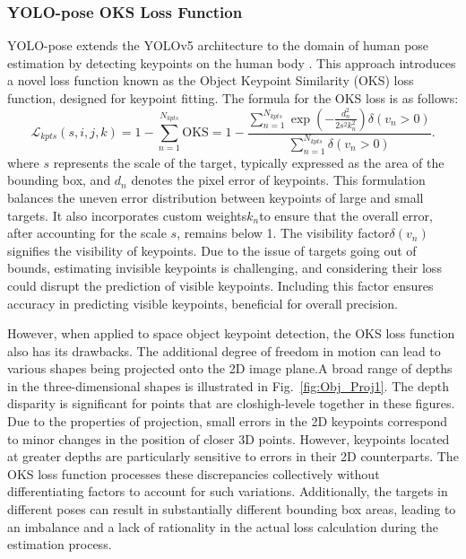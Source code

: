 \documentclass[a4paper,fleqn]{cas-sc}
\begin{document}
\subsubsection{YOLO-pose OKS Loss Function}
YOLO-pose extends the YOLOv5 architecture to the domain of human pose estimation by detecting keypoints on the human body \citep{yolo_pose}. This approach introduces a novel loss function known as the Object Keypoint Similarity (OKS) loss function, designed for keypoint fitting. The formula for the OKS loss is as follows:
\begin{equation}
	\mathcal{L}_{kpts}(s, i, j, k) 
    = 1 - \sum_{n=1}^{N_{kpts}} \mathrm{OKS} 
    = 1 - \frac{\sum\limits_{n=1}^{N_{kpts}} \exp \left(-\frac{d_{n}^{2}}{2 s^{2} k_{n}^{2}}\right) \delta\left(v_{n} > 0\right)}{\sum\limits_{n=1}^{N_{kpts}} \delta\left(v_{n} > 0\right)}.
\end{equation}
where $s$  represents the scale of the target, typically expressed as the area of the bounding box, and $ d_n $ denotes the pixel error of keypoints. This formulation balances the uneven error distribution between keypoints of large and small targets. It also incorporates custom weights$ k_n $to ensure that the overall error, after accounting for the scale $s$, remains below 1. The visibility factor$ \delta(v_n)$ signifies the visibility of keypoints. Due to the issue of targets going out of bounds, estimating invisible keypoints is challenging, and considering their loss could disrupt the prediction of visible keypoints. Including this factor ensures accuracy in predicting visible keypoints, beneficial for overall precision.

However, when applied to space object keypoint detection, the OKS loss function also has its drawbacks. The additional degree of freedom in motion can lead to various shapes being projected onto the 2D image plane.A broad range of depths in the three-dimensional shapes is illustrated in Fig.~\ref{fig:Obj_Proj1}. The depth disparity is significant for points that are closhigh-levele together in these figures. Due to the properties of projection, small errors in the 2D keypoints correspond to minor changes in the position of closer 3D points. However, keypoints located at greater depths are particularly sensitive to errors in their 2D counterparts. The OKS loss function processes these discrepancies collectively without differentiating factors to account for such variations. Additionally, the targets in different poses can result in substantially different bounding box areas, leading to an imbalance and a lack of rationality in the actual loss calculation during the estimation process.
\end{document}
